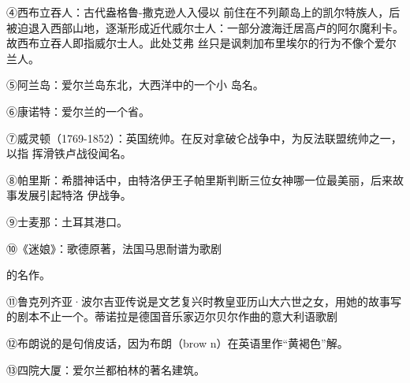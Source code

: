 \documentclass{article}
\begin{document}
④西布立吞人：古代盎格鲁-撒克逊人入侵以
\newpage
前住在不列颠岛上的凯尔特族人，后被迫退入西部山地，逐渐形成近代威尔士人：一部分渡海迁居高卢的阿尔魔利卡。故西布立吞人即指威尔士人。此处艾弗
丝只是讽刺加布里埃尔的行为不像个爱尔兰人。 

⑤阿兰岛：爱尔兰岛东北，大西洋中的一个小
岛名。 


⑥康诺特：爱尔兰的一个省。 

⑦威灵顿（1769-1852）：英国统帅。在反对拿破仑战争中，为反法联盟统帅之一，以指
挥滑铁卢战役闻名。 

⑧帕里斯：希腊神话中，由特洛伊王子帕里斯判断三位女神哪一位最美丽，后来故事发展引起特洛
伊战争。 


⑨士麦那：土耳其港口。 

⑩《迷娘》：歌德原著，法国马思耐谱为歌剧
\newpage

的名作。 

⑪鲁克列齐亚·波尔吉亚传说是文艺复兴时教皇亚历山大六世之女，用她的故事写的剧本不止一个。蒂诺拉是德国音乐家迈尔贝尔作曲的意大利语歌剧

⑫布朗说的是句俏皮话，因为布朗（brow
n）在英语里作“黄褐色”解。 

⑬四院大厦：爱尔兰都柏林的著名建筑。
\end{document}
